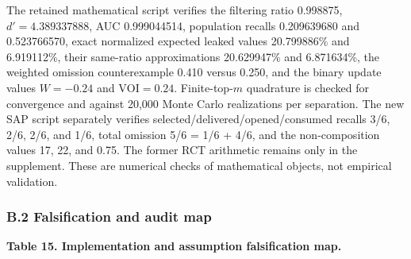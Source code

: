 \documentclass[
  11pt]{article}
\begin{document}
The retained mathematical script verifies the filtering ratio 0.998875,
\(d'=4.389337888\), AUC 0.999044514, population recalls 0.209639680 and
0.523766570, exact normalized expected leaked values 20.799886\% and
6.919112\%, their same-ratio approximations 20.629947\% and 6.871634\%,
the weighted omission counterexample 0.410 versus 0.250, and the binary
update values \(W=-0.24\) and \(\mathrm{VOI}=0.24\). Finite-top-\(m\)
quadrature is checked for convergence and against 20,000 Monte Carlo
realizations per separation. The new SAP script separately verifies
selected/delivered/opened/consumed recalls 3/6, 2/6, 2/6, and 1/6, total
omission 5/6 = 1/6 + 4/6, and the non-composition values 17, 22, and
0.75. The former RCT arithmetic remains only in the supplement. These
are numerical checks of mathematical objects, not empirical validation.

\subsubsection{B.2 Falsification and audit
map}\label{b.2-falsification-and-audit-map}

\textbf{Table 15. Implementation and assumption falsification map.}
\end{document}
